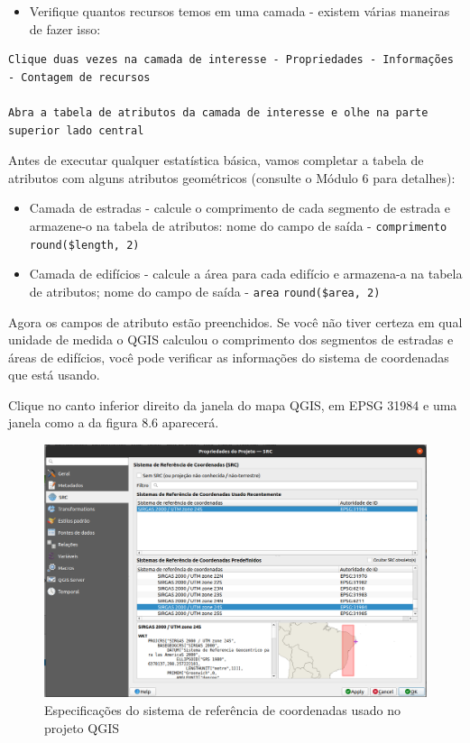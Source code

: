 \documentclass[
]{book}
\providecommand{\tightlist}{%
  \setlength{\itemsep}{0pt}\setlength{\parskip}{0pt}}
\begin{document}
\begin{itemize}
\tightlist
\item
  Verifique quantos recursos temos em uma camada - existem várias maneiras de fazer isso:
\end{itemize}

\begin{verbatim}
Clique duas vezes na camada de interesse - Propriedades - Informações - Contagem de recursos

Abra a tabela de atributos da camada de interesse e olhe na parte superior lado central
\end{verbatim}

Antes de executar qualquer estatística básica, vamos completar a tabela de atributos com alguns atributos geométricos (consulte o Módulo 6 para detalhes):

\begin{itemize}
\tightlist
\item
  Camada de estradas - calcule o comprimento de cada segmento de estrada e armazene-o na tabela de atributos: nome do campo de saída - \texttt{comprimento} \texttt{round(\$length,\ 2)}
\item
  Camada de edifícios - calcule a área para cada edifício e armazena-a na tabela de atributos; nome do campo de saída - \texttt{area} \texttt{round(\$area,\ 2)}
\end{itemize}

Agora os campos de atributo estão preenchidos. Se você não tiver certeza em qual unidade de medida o QGIS calculou o comprimento dos segmentos de estradas e áreas de edifícios, você pode verificar as informações do sistema de coordenadas que está usando.

Clique no canto inferior direito da janela do mapa QGIS, em EPSG 31984 e uma janela como a da figura 8.6 aparecerá.

\begin{figure}
\centering
\includegraphics{media/modulo8/fig86.png}
\caption{Especificações do sistema de referência de coordenadas usado no projeto QGIS}
\end{figure}
\end{document}
